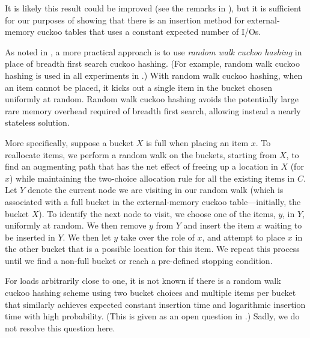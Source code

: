 \documentclass[11pt,letterpaper]{article}
\begin{document}
It is likely this result could be improved
(see the remarks in \cite{dw-badtpcs-07}), but it is sufficient for
our purposes of showing that there is an insertion method for
external-memory cuckoo tables that uses a constant expected number of I/Os.

As noted in \cite{dw-badtpcs-07}, a more practical approach
is to use {\em random walk cuckoo hashing} in place of breadth first
search cuckoo hashing.  (For example, random walk cuckoo hashing is
used in all experiments in \cite{dw-badtpcs-07}.)  With
random walk cuckoo hashing, when an item cannot be placed, it kicks
out a single item in the bucket chosen uniformly at random.  Random
walk cuckoo hashing avoids the potentially large rare memory overhead
required of breadth first search, allowing instead a nearly stateless
solution.

More specifically, suppose a bucket $X$ is full when placing an item
$x$.  To reallocate items, we perform a random walk on the buckets,
starting from $X$, to find an augmenting path that has the net effect
of freeing up a location in $X$ (for $x$) while maintaining the
two-choice allocation rule for all the existing items in $C$.  Let
$Y$ denote the current node we are visiting in our random walk (which
is associated with a full bucket in the external-memory cuckoo
table---initially, the bucket $X$).  To identify the next node to
visit, we choose one of the items, $y$, in $Y$, uniformly at
random.  We then remove $y$ from $Y$ and insert the item $x$ waiting
to be inserted in $Y$.  We then let $y$ take over the role of $x$, and
attempt to place $x$ in the other bucket that is a possible
location for this item.  We repeat this process until we find a
non-full bucket or reach a pre-defined stopping condition.

For loads arbitrarily close to one, it is not known if there is a random walk cuckoo hashing scheme using
two bucket choices and
multiple items per bucket that similarly achieves expected constant
insertion time and logarithmic insertion time with high probability.
(This is given as an open question in \cite{dw-badtpcs-07}.)
Sadly, we do not resolve this question here.
\end{document}
